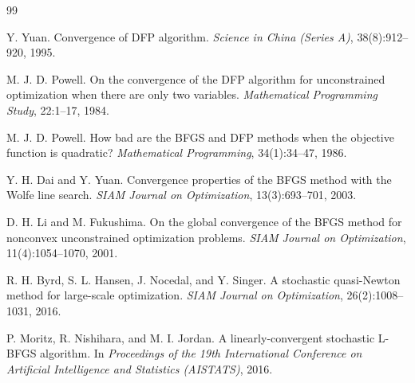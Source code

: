 \documentclass[12pt,a4paper]{article}  %
\theoremstyle{definition}
\numberwithin{equation}{section}
\begin{document}
\begin{thebibliography}{99}

Y. Yuan.
Convergence of DFP algorithm.
\textit{Science in China (Series A)}, 38(8):912--920, 1995.

M. J. D. Powell.
On the convergence of the DFP algorithm for unconstrained optimization when there are only two variables.
\textit{Mathematical Programming Study}, 22:1--17, 1984.

M. J. D. Powell.
How bad are the BFGS and DFP methods when the objective function is quadratic?
\textit{Mathematical Programming}, 34(1):34--47, 1986.

Y. H. Dai and Y. Yuan.
Convergence properties of the BFGS method with the Wolfe line search.
\textit{SIAM Journal on Optimization}, 13(3):693--701, 2003.

D. H. Li and M. Fukushima.
On the global convergence of the BFGS method for nonconvex unconstrained optimization problems.
\textit{SIAM Journal on Optimization}, 11(4):1054--1070, 2001.

R. H. Byrd, S. L. Hansen, J. Nocedal, and Y. Singer.
A stochastic quasi-Newton method for large-scale optimization.
\textit{SIAM Journal on Optimization}, 26(2):1008--1031, 2016.

P. Moritz, R. Nishihara, and M. I. Jordan.
A linearly-convergent stochastic L-BFGS algorithm.
In \textit{Proceedings of the 19th International Conference on Artificial Intelligence and Statistics (AISTATS)}, 2016.

\end{thebibliography}
\end{document}
